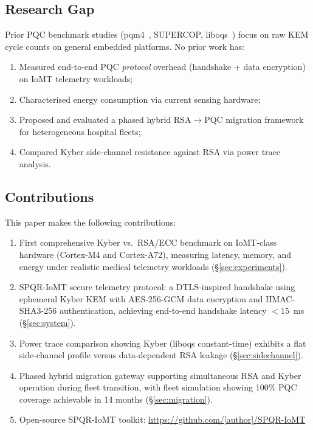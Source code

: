 \documentclass[10pt,journal,compsoc]{IEEEtran}
\begin{document}
\subsection{Research Gap}

Prior PQC benchmark studies (pqm4~\cite{kannwischer2019}, SUPERCOP,
liboqs~\cite{oqs2023}) focus on raw KEM cycle counts on general
embedded platforms.
No prior work has:
\begin{enumerate}
\item Measured end-to-end PQC \emph{protocol} overhead (handshake +
      data encryption) on IoMT telemetry workloads;
\item Characterised energy consumption via current sensing hardware;
\item Proposed and evaluated a phased hybrid RSA$\to$PQC migration
      framework for heterogeneous hospital fleets;
\item Compared Kyber side-channel resistance against RSA via power
      trace analysis.
\end{enumerate}

\subsection{Contributions}

This paper makes the following contributions:
\begin{enumerate}
\item[\textbf{C1}] First comprehensive Kyber vs.\ RSA/ECC benchmark
  on IoMT-class hardware (Cortex-M4 and Cortex-A72), measuring
  latency, memory, and energy under realistic medical telemetry
  workloads (\S\ref{sec:experiments}).

\item[\textbf{C2}] SPQR-IoMT secure telemetry protocol: a
  DTLS-inspired handshake using ephemeral Kyber KEM with AES-256-GCM
  data encryption and HMAC-SHA3-256 authentication, achieving
  end-to-end handshake latency $<15$~ms (\S\ref{sec:system}).

\item[\textbf{C3}] Power trace comparison showing Kyber (liboqs
  constant-time) exhibits a flat side-channel profile versus
  data-dependent RSA leakage (\S\ref{sec:sidechannel}).

\item[\textbf{C4}] Phased hybrid migration gateway supporting
  simultaneous RSA and Kyber operation during fleet transition,
  with fleet simulation showing 100\% PQC coverage achievable in
  14 months (\S\ref{sec:migration}).

\item[\textbf{C5}] Open-source SPQR-IoMT toolkit:
  \url{https://github.com/[author]/SPQR-IoMT}
\end{enumerate}
\end{document}
